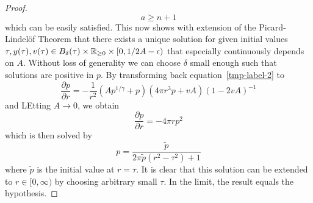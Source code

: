 \begin{appendix}
\begin{section}
\begin{proof}
	\begin{equation}
		a\geq n+1
	\end{equation}
	which can be easily satisfied. 
	This now shows with extension of the Picard-Lindelöf Theorem that there exists a unique solution for given initial values $\tau, y(\tau), v(\tau)\in B_{\delta}(\tau)\times\mathbb{R}_{\geq0}\times[0,1/2A-\epsilon)$ that especially continuously depends on $A$.
	Without loss of generality we can choose $\delta$ small enough such that solutions are positive in $p$.
	By transforming back equation~\ref{tmp-label-2} to 
	\begin{equation}
		\frac{\partial p}{\partial r} = -\frac{1}{r^2}\left(Ap^{1/\gamma}+p\right)\left(4\pi r^3p+vA\right)\left(1-2vA\right)^{-1}
	\end{equation}
	and \ac{LE}tting $A\rightarrow0$, we obtain
	\begin{equation}
		\frac{\partial p}{\partial r} = - 4\pi rp^2
	\end{equation}
	which is then solved by
	\begin{equation}
		p = \frac{\tilde{p}}{2\pi\tilde{p}(r^2-\tau^2)+1}
	\end{equation}
	where $\tilde{p}$ is the initial value at $r=\tau$.
	It is clear that this solution can be extended to $r\in[0,\infty)$ by choosing arbitrary small $\tau$.
	In the limit, the result equals the hypothesis.
\end{proof}
%
%
%

\end{section}
\end{appendix}
